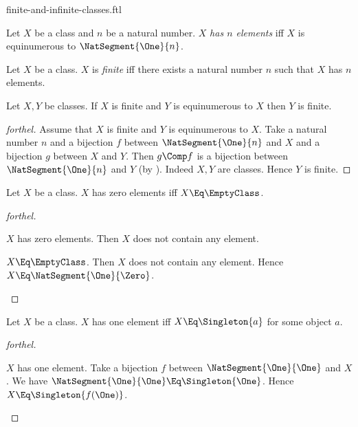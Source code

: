 \documentclass{stex}
\begin{document}
\begin{smodule}{finite-and-infinite-classes.ftl}



\begin{definition*}[forthel]
  Let $X$ be a class and $n$ be a natural number.
  $X$ \emph{has $n$ elements} iff $X$ is equinumerous to $\NatSegment{\One}{n}$.
\end{definition*}

\begin{definition*}[forthel,for=finite]
  Let $X$ be a class.
  $X$ is \emph{finite} iff there exists a natural number $n$ such that $X$ has $n$ elements.
\end{definition*}

\begin{proposition*}[forthel]
  Let $X, Y$ be classes.
  If $X$ is finite and $Y$ is equinumerous to $X$ then $Y$ is finite.
\end{proposition*}
\begin{proof}[forthel]
  Assume that $X$ is finite and $Y$ is equinumerous to $X$.
  Take a natural number $n$ and a bijection $f$ between $\NatSegment{\One}{n}$ and $X$ and a bijection $g$ between $X$ and $Y$.
  Then $g \Comp f$ is a bijection between $\NatSegment{\One}{n}$ and $Y$ (by ).
  Indeed $X, Y$ are classes.
  Hence $Y$ is finite.
\end{proof}

\begin{proposition*}[forthel]
  Let $X$ be a class.
  $X$ has zero elements iff $X \Eq \EmptyClass$.
\end{proposition*}
\begin{proof}[forthel]
  \begin{case}{$X$ has zero elements.}
    Then $X$ does not contain any element.
  \end{case}

  \begin{case}{$X \Eq \EmptyClass$.}
    Then $X$ does not contain any element.
    Hence $X \Eq \NatSegment{\One}{\Zero}$.
  \end{case}
\end{proof}

\begin{proposition*}[forthel]
  Let $X$ be a class.
  $X$ has one element iff $X \Eq \Singleton{a}$ for some object $a$.
\end{proposition*}
\begin{proof}[forthel]
  \begin{case}{$X$ has one element.}
    Take a bijection $f$ between $\NatSegment{\One}{\One}$ and $X$.
    We have $\NatSegment{\One}{\One} \Eq \Singleton{\One}$.
    Hence $X \Eq \Singleton{f(\One)}$.
  \end{case}


\end{proof}
\end{smodule}
\end{document}
